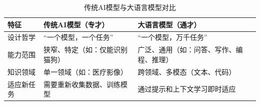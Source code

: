 \documentclass[../main.tex]{subfiles}
\begin{document}
\begin{table}[H]
    \centering
    \caption{传统AI模型与大语言模型对比}
    \begin{tabular}{p{2.2cm}p{5.4cm}p{5.4cm}}
        \toprule
        特征 & 传统AI模型（专才） & 大语言模型（通才） \\
        \midrule
        设计哲学 & “一个模型，一个任务” & “一个模型，万千任务” \\
        能力范围 & 狭窄、特定（如：仅能识别猫狗） & 广泛、通用（如：问答、写作、编程、推理） \\
        知识领域 & 单一领域（如：医疗影像） & 跨领域、多模态（文本、代码） \\
        适应新任务 & 需要重新收集数据、训练模型 & 通过提示和上下文学习即时适应 \\
        \bottomrule
    \end{tabular}
\end{table}
\end{document}
